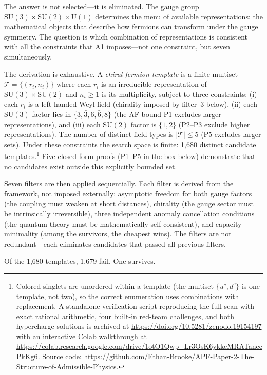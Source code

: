 \documentclass[11pt]{article}
\newcommand{\SU}{\mathrm{SU}}
\newcommand{\U}{\mathrm{U}}
\begin{document}
The answer is not selected---it is eliminated.  The gauge group $\SU(3) \times \SU(2) \times \U(1)$ determines the menu of available representations: the mathematical objects that describe how fermions can transform under the gauge symmetry.  The question is which combination of representations is consistent with all the constraints that A1 imposes---not one constraint, but seven simultaneously.

The derivation is exhaustive.  A \emph{chiral fermion template} is a finite multiset $\mathcal{T} = \{(r_i, n_i)\}$ where each $r_i$ is an irreducible representation of $\SU(3) \times \SU(2)$ and $n_i \ge 1$ is its multiplicity, subject to three constraints: (i) each $r_i$ is a left-handed Weyl field (chirality imposed by filter~3 below), (ii) each $\SU(3)$ factor lies in $\{3, \bar{3}, 6, \bar{6}, 8\}$ (the AF bound P1 excludes larger representations), and (iii) each $\SU(2)$ factor is $\{1, 2\}$ (P2--P3 exclude higher representations).  The number of distinct field types is $|\mathcal{T}| \le 5$ (P5 excludes larger sets).  Under these constraints the search space is finite: 1{,}680 distinct candidate templates.\footnote{Colored singlets are unordered within a template (the multiset $\{u^c, d^c\}$ is one template, not two), so the correct enumeration uses combinations with replacement.  A standalone verification script reproducing the full scan with exact rational arithmetic, four built-in red-team challenges, and both hypercharge solutions is archived at \url{https://doi.org/10.5281/zenodo.19154197} with an interactive Colab walkthrough at \url{https://colab.research.google.com/drive/1otO1Qwp_Lr3OsK6ykkeMRATanecPkKg6}.  Source code: \url{https://github.com/Ethan-Brooke/APF-Paper-2-The-Structure-of-Admissible-Physics}.}  Five closed-form proofs (P1--P5 in the box below) demonstrate that no candidates exist outside this explicitly bounded set.

Seven filters are then applied sequentially.  Each filter is derived from the framework, not imposed externally: asymptotic freedom for both gauge factors (the coupling must weaken at short distances), chirality (the gauge sector must be intrinsically irreversible), three independent anomaly cancellation conditions (the quantum theory must be mathematically self-consistent), and capacity minimality (among the survivors, the cheapest wins).  The filters are not redundant---each eliminates candidates that passed all previous filters.

Of the 1{,}680 templates, 1{,}679 fail.  One survives.
\end{document}
